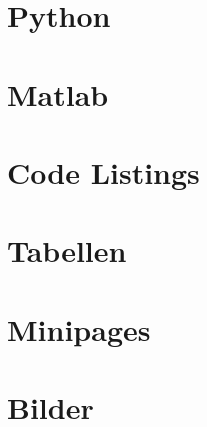 \documentclass{beamer}                %
\begin{document}
\section<handout:0>{Python} %

\section<handout:0>{Matlab} %

\section<handout:0>{Code Listings} %

\section<handout:0>{Tabellen} %

\section<handout:0>{Minipages} %

\section<handout:0>{Bilder} %
\end{document}
